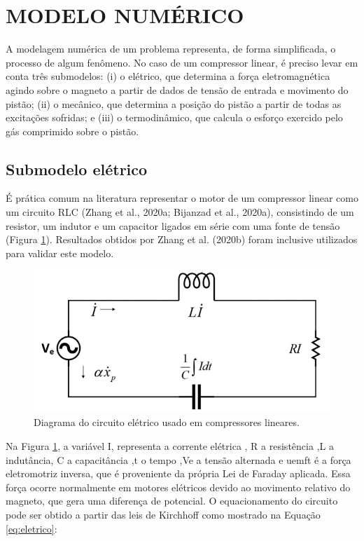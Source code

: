 \section{MODELO NUMÉRICO}

A modelagem numérica de um problema representa, de forma simplificada, o processo de algum fenômeno. No caso de um compressor linear, é preciso levar em conta três submodelos: (i) o elétrico, que determina a força eletromagnética agindo sobre o magneto a partir de dados de tensão de entrada e movimento do pistão; (ii) o mecânico, que determina a posição do pistão a partir de todas as excitações sofridas; e (iii) o termodinâmico, que calcula o esforço exercido pelo gás comprimido sobre o pistão.


\subsection{Submodelo elétrico}

É prática comum na literatura representar o motor de um compressor linear como um circuito RLC (Zhang et al., 2020a; Bijanzad et al., 2020a), consistindo de um resistor, um indutor e um capacitor ligados em série com uma fonte de tensão (Figura \ref{fig:circuito-eletrico}). Resultados obtidos por Zhang et al. (2020b) foram inclusive utilizados para validar este modelo.

\begin{figure}[htb]
	\caption{\label{fig:circuito-eletrico} Diagrama do circuito elétrico usado em compressores lineares.}
	\begin{center}
		\includegraphics[scale=0.65]{images/circuito.png}
	\end{center}
\end{figure}

Na Figura \ref{fig:circuito-eletrico}, a variável I, representa a corrente elétrica , R a resistência ,L a indutância, C a capacitância ,t o tempo ,Ve a tensão alternada e uemft é a força eletromotriz inversa, que é proveniente da própria Lei de Faraday aplicada. Essa força ocorre normalmente em motores elétricos devido ao movimento relativo do magneto, que gera uma diferença de potencial. O equacionamento do circuito pode ser obtido a partir das leis de Kirchhoff como mostrado na Equação \ref{eq:eletrico}: 




